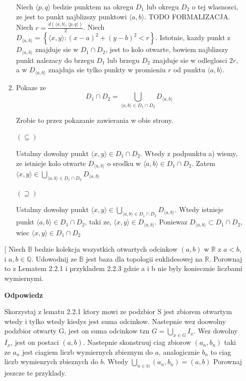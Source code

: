 \documentclass{article}
\makeatletter
\def\myitem{%
   \@ifnextchar[ \@myitem{\@noitemargtrue\@myitem[\@itemlabel]}}
\def\@myitem[#1]{\item[#1]\mbox{}\\}
\makeatother
\begin{document}
\begin{enumerate}[align=left]
\begin{enumerate}[label=(\alph*)]
                Niech $\langle p,q \rangle$ bedzie punktem na okregu $D_{1}$ lub okregu $D_{2}$ o tej wlasnosci, ze jest to punkt najblizszy punktowi $\langle a, b \rangle$. TODO FORMALIZACJA. Niech $r = \frac{d(\langle a,b \rangle, \langle p, q\rangle)}{2}$. Niech $D_{\langle a, b \rangle} = \left\{\langle x,y \rangle: (x-a)^{2} + (y-b)^{2} < r \right\}$. Istotnie, kazdy punkt z $D_{\langle a,b\rangle}$ znajduje sie w $D_{1}\cap D_{2}$, jest to kolo otwarte, bowiem najblizszy punkt nalezacy do brzegu $D_{1}$ lub brzegu $D_{2}$ znajduje sie w odleglosci $2r$, a w $D_{\langle a,b \rangle}$ znajduja sie tylko punkty w promieniu $r$ od punktu $\langle a,b\rangle$. 

            \item Pokaze ze $$D_{1} \cap D_{2} = \bigcup\limits_{\langle a,b \rangle \in D_{1} \cap D_{2}}D_{\langle a,b \rangle}$$

                Zrobie to przez pokazanie zawierania w obie strony.

                $(\subseteq)$

                Ustalmy dowolny punkt $\langle x,y \rangle \in D_{1}\cap D_{2}$. Wtedy z podpunktu a) wiemy, ze istnieje kolo otwarte $D_{\langle a,b \rangle}$ o srodku w $\langle a,b\rangle \in D_{1}\cap D_{2}$. Zatem $\langle x,y \rangle \in \bigcup\limits_{\langle a,b \rangle \in D_{1} \cap D_{2}}D_{\langle a,b \rangle}$  


                $(\supseteq)$
                
                Ustalmy dowolny punkt $\langle x,y \rangle \in \bigcup\limits_{\langle a,b \rangle \in D_{1} \cap D_{2}}D_{\langle a,b \rangle}$. Wtedy istnieje punkt $\langle a,b \rangle \in D_{1} \cap D_{2}$, taki ze, $\langle x,y \rangle \in D_{\langle a,b \rangle}$. Poniewaz $D_{\langle a,b \rangle} \subset D_{1}\cap D_{2}$, wiec $\langle x,y\rangle \in D_{1} \cap D_{2}$
        \end{enumerate}

        \myitem Niech $\mathbb{B}$ bedzie kolekcja wszystkich otwartych odcinkow $(a,b)$ w $\mathbb{R}$ z $a < b$, i $a,b \in \mathbb{Q}$. Udowodnij ze $\mathbb{B}$ jest baza dla topologii euklidesowej na $\mathbb{R}$. Porownaj to z Lematem 2.2.1 i przykladem 2.2.3 gdzie a i b nie byly koniecznie liczbami wymiernymi.
       
        \textbf{Odpowiedz}

        Skorzystaj z lematu 2.2.1 ktory mowi ze podzbior S jest zbiorem otwartym wtedy i tylko wtedy kiedys jest suma odcinkow. Nastepnie wez doowolny podzbior otwarty G, jest on suma odcinkow tzn $G = \bigcup\limits_{x \in G}I_{x}$. Wez dowolny $I_{x}$, jest on postaci $(a,b)$. Nastepnie skonstruuj ciag zbiorow $(a_{n}, b_{n})$ taki ze $a_{n}$ jest ciagiem liczb wymiernych zbieznym do $a$, analogicznie $b_{n}$ to ciag liczb wymienrych zbieznych do $b$. Wtedy $\bigcup\limits_{n \in \mathbb{N}}(a_{n}, b_{n}) = (a, b)$
Porownaj jeszcze te przyklady.


\end{enumerate}
\end{document}
